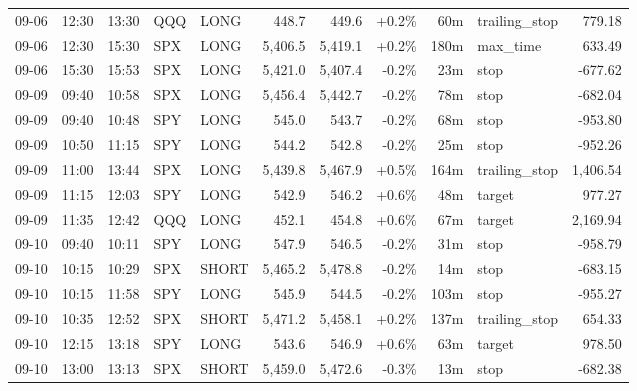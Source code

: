 \documentclass[11pt,a4paper,twoside]{article}
\begin{document}
\begin{center}
\begin{longtable}{>{\color{txtmain}}l l l l l r r r r >{\color{txtmain}}l r}
09-06 & 12:30 & 13:30 & QQQ & LONG & 448.7 & 449.6 & \textcolor{wingreen}{+0.2\%} & 60m & trailing\_stop & \textcolor{wingreen}{779.18} \\
09-06 & 12:30 & 15:30 & SPX & LONG & 5,406.5 & 5,419.1 & \textcolor{wingreen}{+0.2\%} & 180m & max\_time & \textcolor{wingreen}{633.49} \\
09-06 & 15:30 & 15:53 & SPX & LONG & 5,421.0 & 5,407.4 & \textcolor{lossred}{-0.2\%} & 23m & stop & \textcolor{lossred}{-677.62} \\
09-09 & 09:40 & 10:58 & SPX & LONG & 5,456.4 & 5,442.7 & \textcolor{lossred}{-0.2\%} & 78m & stop & \textcolor{lossred}{-682.04} \\
09-09 & 09:40 & 10:48 & SPY & LONG & 545.0 & 543.7 & \textcolor{lossred}{-0.2\%} & 68m & stop & \textcolor{lossred}{-953.80} \\
09-09 & 10:50 & 11:15 & SPY & LONG & 544.2 & 542.8 & \textcolor{lossred}{-0.2\%} & 25m & stop & \textcolor{lossred}{-952.26} \\
09-09 & 11:00 & 13:44 & SPX & LONG & 5,439.8 & 5,467.9 & \textcolor{wingreen}{+0.5\%} & 164m & trailing\_stop & \textcolor{wingreen}{1,406.54} \\
09-09 & 11:15 & 12:03 & SPY & LONG & 542.9 & 546.2 & \textcolor{wingreen}{+0.6\%} & 48m & target & \textcolor{wingreen}{977.27} \\
09-09 & 11:35 & 12:42 & QQQ & LONG & 452.1 & 454.8 & \textcolor{wingreen}{+0.6\%} & 67m & target & \textcolor{wingreen}{2,169.94} \\
09-10 & 09:40 & 10:11 & SPY & LONG & 547.9 & 546.5 & \textcolor{lossred}{-0.2\%} & 31m & stop & \textcolor{lossred}{-958.79} \\
09-10 & 10:15 & 10:29 & SPX & SHORT & 5,465.2 & 5,478.8 & \textcolor{lossred}{-0.2\%} & 14m & stop & \textcolor{lossred}{-683.15} \\
09-10 & 10:15 & 11:58 & SPY & LONG & 545.9 & 544.5 & \textcolor{lossred}{-0.2\%} & 103m & stop & \textcolor{lossred}{-955.27} \\
09-10 & 10:35 & 12:52 & SPX & SHORT & 5,471.2 & 5,458.1 & \textcolor{wingreen}{+0.2\%} & 137m & trailing\_stop & \textcolor{wingreen}{654.33} \\
09-10 & 12:15 & 13:18 & SPY & LONG & 543.6 & 546.9 & \textcolor{wingreen}{+0.6\%} & 63m & target & \textcolor{wingreen}{978.50} \\
09-10 & 13:00 & 13:13 & SPX & SHORT & 5,459.0 & 5,472.6 & \textcolor{lossred}{-0.3\%} & 13m & stop & \textcolor{lossred}{-682.38} \\

\end{longtable}
\end{center}
\end{document}
